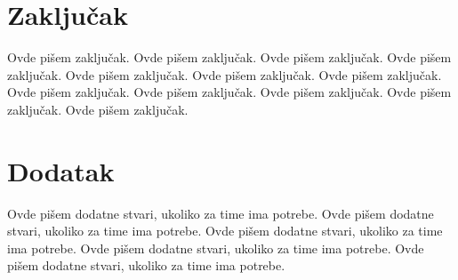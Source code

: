 \documentclass[a4paper]{article}
\begin{document}
\section{Zaključak}
\label{sec:zakljucak}

Ovde pišem zaključak. 
Ovde pišem zaključak. 
Ovde pišem zaključak. 
Ovde pišem zaključak. 
Ovde pišem zaključak. 
Ovde pišem zaključak. 
Ovde pišem zaključak. 
Ovde pišem zaključak. 
Ovde pišem zaključak. 
Ovde pišem zaključak. 
Ovde pišem zaključak. 
Ovde pišem zaključak. 


\appendix
 


\appendix
\section{Dodatak}
Ovde pišem dodatne stvari, ukoliko za time ima potrebe.
Ovde pišem dodatne stvari, ukoliko za time ima potrebe.
Ovde pišem dodatne stvari, ukoliko za time ima potrebe.
Ovde pišem dodatne stvari, ukoliko za time ima potrebe.
Ovde pišem dodatne stvari, ukoliko za time ima potrebe.
\end{document}
